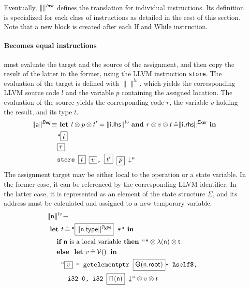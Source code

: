 \documentclass{llncs}
\newcommand{\trad}[2]{\ensuremath{\lVert \textsf{#1} \rVert^{\textit{#2}}}}
\newcommand{\nl}[0]{\ensuremath{\downarrow}}
\DeclareMathOperator{\conc}{\diamond}
\DeclareMathOperator{\isdef}{\equiv}
\DeclareMathOperator{\variable}{\mathcal{V}()}
\newcommand{\llvm}[1]{\texttt{#1}}
\newcommand{\B}[1]{\textsf{#1}}
\newcommand{\IF}[0]{\textbf{ if }}
\newcommand{\ELSE}[0]{\textbf{ else }}
\newcommand{\THEN}[0]{\textbf{ then }}
\newcommand{\LET}[0]{\textbf{ let }}
\DeclareMathOperator{\BE}{\hat{=}}
\newcommand{\IN}[0]{\textbf{ in }}
\newcommand{\AND}[0]{\textbf{ and }}
\newcommand{\PH}[1]{\framebox{$#1$}}
\newcommand{\sep}[0]{\otimes}
\newcommand{\local}[0]{\ensuremath{\sf\lambda}}
\newcommand{\idx}[0]{\ensuremath{\sf\Pi}}
\newcommand{\state}[0]{\ensuremath{\sf\Theta}}
\newcommand{\self}[0]{\llvm{\%self\$}}
\begin{document}
Eventually, $\trad{}{\B{Inst}}$ defines the translation for individual
instructions. Its definition is specialized for each class of instructions as
detailed in the rest of this section. Note that a new block is created after
each \B{If} and \B{While} instruction.

\paragraph{Becomes equal instructions} must evaluate the target and the source
of the assignment, and then copy the result of the latter in the former, using
the LLVM instruction \llvm{store}. The evaluation of the target is defined with
$\trad{}{lv}$, which yields the corresponding LLVM source code $l$ and the
variable $p$ containing the assigned location. The evaluation of the source
yields the corresponding code $r$, the variable $v$ holding the result, and its
type $t$.
\begin{align*}
\begin{split}
  \trad{a}{\B{Beq}} \isdef
  & \LET l \sep p \sep t'= \trad{i.lhs}{lv} \AND r \sep v \sep t \BE \trad{i.rhs}{\B{Expr}} \IN \\
  & \llvm{"\PH{l}} \\
  & \llvm{\PH{r}} \\
  & \llvm{store \PH{t} \PH{v}, \PH{t'} \PH{p} \nl"}
\end{split}
\end{align*}
The assignment target may be either local to the operation or a state
variable. In the former case, it can be referenced by the corresponding LLVM
identifier. In the latter case, it is represented as an element of the state
structure $\Sigma$, and its address must be calculated and assigned to a new temporary
variable.
\begin{align*}
\lefteqn{\trad{n}{lv} \isdef} \\
& \LET t \BE \llvm{"\PH{\trad{\B{n.type}}{Type}} *"} \IN \\
& \quad \IF \mbox{\B{n} is a local variable} \THEN \llvm{""} \sep \local(\B{n}) \sep t \\
& \quad \ELSE \LET v \BE \variable \IN \\
& \quad \quad \llvm{"\PH{v} = getelementptr \PH{\state(\B{n.root})}* \self,} \\
& \quad \quad \quad \llvm{i32 0, i32 \PH{\idx(\B{n})} \nl"} \sep v \sep t
\end{align*}
\end{document}
